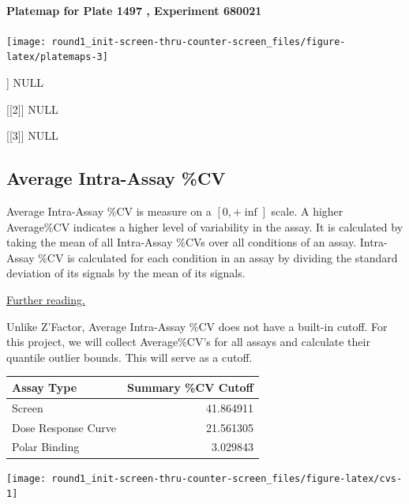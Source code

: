 \documentclass[
]{article}
\begin{document}
\paragraph{Platemap for Plate 1497 , Experiment
680021}\label{platemap-for-plate-1497-experiment-680021}

\begin{center}\texttt{[image: round1\_init-screen-thru-counter-screen\_files/figure-latex/platemaps-3]} \end{center}

\newpage[[1]

{]} NULL

{[}{[}2{]}{]} NULL

{[}{[}3{]}{]} NULL

\newpage

\subsection{Average Intra-Assay \%CV}\label{average-intra-assay-cv}

Average Intra-Assay \%CV is measure on a \([0, +\inf]\) scale. A higher
Average\%CV indicates a higher level of variability in the assay. It is
calculated by taking the mean of all Intra-Assay \%CVs over all
conditions of an assay. Intra-Assay \%CV is calculated for each
condition in an assay by dividing the standard deviation of its signals
by the mean of its signals.

\href{https://toptipbio.com/calculate-coefficient-variation-cv/}{Further
reading.}

Unlike Z'Factor, Average Intra-Assay \%CV does not have a built-in
cutoff. For this project, we will collect Average\%CV's for all assays
and calculate their quantile outlier bounds. This will serve as a
cutoff.

\begin{longtable}[]{@{}lr@{}}
\toprule\noalign{}
Assay Type & Summary \%CV Cutoff \\
\midrule\noalign{}
\endhead
\bottomrule\noalign{}
\endlastfoot
Screen & 41.864911 \\
Dose Response Curve & 21.561305 \\
Polar Binding & 3.029843 \\
\end{longtable}

\begin{center}\texttt{[image: round1\_init-screen-thru-counter-screen\_files/figure-latex/cvs-1]} \end{center}
\end{document}
